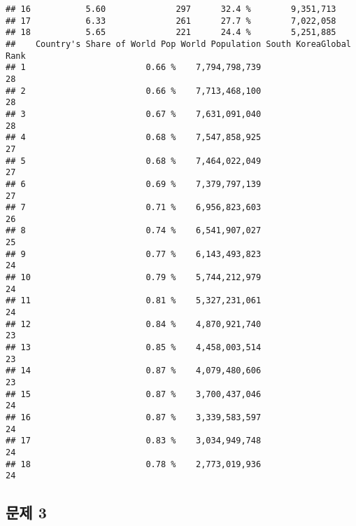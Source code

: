 \documentclass[
]{article}
\begin{document}
\begin{verbatim}
## 16           5.60              297      32.4 %        9,351,713
## 17           6.33              261      27.7 %        7,022,058
## 18           5.65              221      24.4 %        5,251,885
##    Country's Share of World Pop World Population South KoreaGlobal Rank
## 1                        0.66 %    7,794,798,739                     28
## 2                        0.66 %    7,713,468,100                     28
## 3                        0.67 %    7,631,091,040                     28
## 4                        0.68 %    7,547,858,925                     27
## 5                        0.68 %    7,464,022,049                     27
## 6                        0.69 %    7,379,797,139                     27
## 7                        0.71 %    6,956,823,603                     26
## 8                        0.74 %    6,541,907,027                     25
## 9                        0.77 %    6,143,493,823                     24
## 10                       0.79 %    5,744,212,979                     24
## 11                       0.81 %    5,327,231,061                     24
## 12                       0.84 %    4,870,921,740                     23
## 13                       0.85 %    4,458,003,514                     23
## 14                       0.87 %    4,079,480,606                     23
## 15                       0.87 %    3,700,437,046                     24
## 16                       0.87 %    3,339,583,597                     24
## 17                       0.83 %    3,034,949,748                     24
## 18                       0.78 %    2,773,019,936                     24
\end{verbatim}

\hypertarget{uxbb38uxc81c-3}{%
\subsection{문제 3}\label{uxbb38uxc81c-3}}
\end{document}
